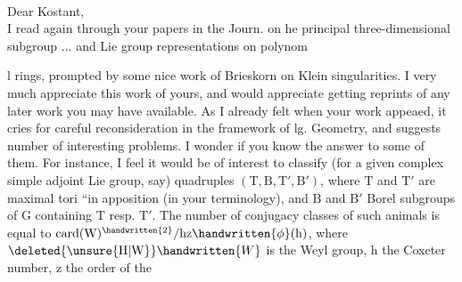 \\

Dear Kostant,\\

I read again through your papers in the  Journ. on he principal three-dimensional subgroup ... and Lie group representations on polynoml rings, prompted by some nice work of Brieskorn on Klein singularities. I very much appreciate this work of yours, and would appreciate getting reprints of any later work you may have available. As I already felt when your work appeaed, it cries for careful reconsideration in the framework of lg. Geometry, and suggests number of interesting problems. I wonder if you know the answer to some of them. For instance, I feel it would be of interest to classify (for a given complex simple adjoint Lie group, say) quadruples $(\mathrm{T},\mathrm{B},\mathrm{T}',\mathrm{B}')$, where $\mathrm{T}$ and $\mathrm{T}'$ are maximal tori ``in apposition (in your terminology), and $\mathrm{B}$ and $\mathrm{B}'$ Borel subgroups of $\mathrm{G}$ containing $\mathrm{T}$ resp. $\mathrm{T}'$. The number of conjugacy classes of such animals is equal to $\operatorname{card}(\mathrm{W})^{\handwritten{2}}/\mathrm{hz}\handwritten{\phi}(\mathrm{h})$, where $\deleted{\unsure{\mathrm{H}|\mathrm{W}}}\handwritten{W}$ is the Weyl group, $\mathrm{h}$ the Coxeter number, $\mathrm{z}$ the order of the 
